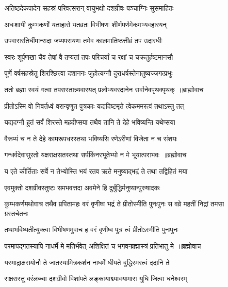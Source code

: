 \twolineshloka
{अतिष्ठदेकपादेन सहस्रं परिवत्सरान्}
{वायुभक्षो दशग्रीवः पञ्चाग्निः सुसमाहितः}


\twolineshloka
{अधःशायी कुम्भकर्णो यताहारो यतव्रतः}
{विभीषणः शीर्णपर्णमेकमभ्यवहारयन्}


\twolineshloka
{उपवासरतिर्धीमान्सदा जप्यपरायणः}
{तमेव कालमातिष्ठत्तीव्रं तप उदारधीः}


\twolineshloka
{स्वरः शूर्पणखा चैव तेषां वै तप्यतां तपः}
{परिचर्यां च रक्षां च चक्रतुर्हष्टमानसौ}


\twolineshloka
{पूर्णे वर्षसहस्रेतु शिरश्छित्त्वा दशाननः}
{जुहोत्यग्नौ दुराधर्षस्तेनातुष्यज्जगत्प्रभुः}


\threelineshloka
{ततो ब्रह्मा स्वयं गत्वा तपसस्तान्न्यवारयत्}
{प्रलोभ्यवरदानेन सर्वानेवपृथक्पृथक् ॥ब्राह्मोवाच}
{}


\twolineshloka
{प्रीतोऽस्मि वो निवर्तध्वं वरान्वृणुत पुत्रकाः}
{यद्यदिष्टमृते त्वेकममरत्वं तथाऽस्तु तत्}


\twolineshloka
{यद्यदग्नौ हुतं सर्वं शिरस्ते महदीप्सया}
{तथैव तानि ते देहे भविष्यन्ति यथेप्सया}


\twolineshloka
{वैरूप्यं च न ते देहे कामरूपधरस्तथा}
{भविष्यसि रणेऽरीणां विजेता न च संशयः}



\threelineshloka
{गन्धर्वदेवासुरतो यक्षराक्षसतस्तथा}
{सर्पकिंनरभूतेभ्यो न मे भूयात्पराभवः ॥ब्रह्मोवाच}
{}


\twolineshloka
{य एते कीर्तिताः सर्वे न तेभ्योस्ति भयं रतव}
{ऋते मनुष्याद्भद्रं ते तथा तद्विहितं मया}



\twolineshloka
{एवमुक्तो दशग्रीवस्तुष्टः समभवत्तदा}
{अवमेने हि दुर्बुद्धिर्मनुष्यान्पुरुषादकः}


\threelineshloka
{कुम्भकर्णमथोवाच तथैव प्रपितामहः}
{वरं वृणीष्व भद्रं ते प्रीतोस्मीति पुनःपुनः}
{स वव्रे महतीं निद्रां तमसा ग्रस्तचेतनः}


\twolineshloka
{तथाभविष्यतीत्युक्त्वा विभीषणमुवाच ह}
{वरं वृणीष्व पुत्र त्वं प्रीतोऽस्मीति पुनःपुनः}



\threelineshloka
{परमापद्गतस्यापि नाधर्मे मे मतिर्भवेत्}
{अशिक्षितं च भगवन्ब्रह्मास्त्रं प्रतिभातु मे ॥ब्रह्मोवाच}
{}


\twolineshloka
{यस्माद्राक्षसयोनौ ते जातस्यामित्रकर्शन}
{नाधर्मे धीयते बुद्धिरमरत्वं ददानि ते}



\twolineshloka
{राक्षसस्तु वरंलब्ध्वा दशग्रीवो विशांपते}
{लङ्कायाश्च्यावयामास युधि जित्वा धनेश्वरम्}


